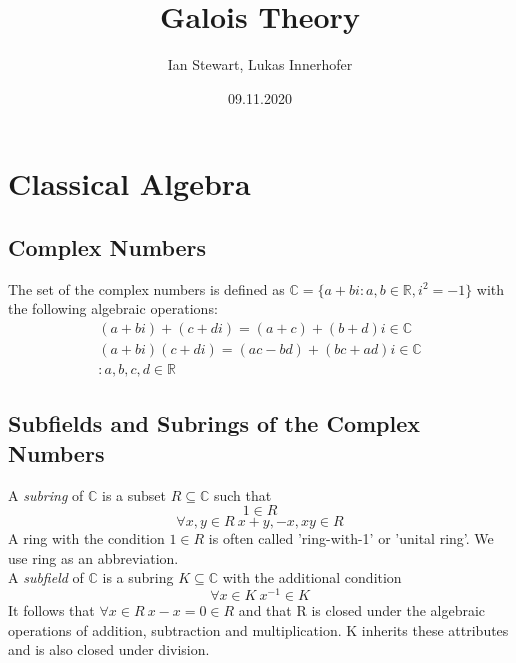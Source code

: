 \documentclass{book}
\title{Galois Theory}
\author{Ian Stewart, Lukas Innerhofer}
\date{09.11.2020}
\begin{document}
    \maketitle
    \tableofcontents

    \chapter{Classical Algebra}
    \section{Complex Numbers}
    The set of the complex numbers is defined as 
    \(\mathbb{C} = \{a + bi : a,b \in \mathbb{R},i^2 = -1\}\)
    with the following algebraic operations:
    \begin{equation} \label{complex operations}
    \begin{split}
        (a + bi) + (c + di) = (a + c) + (b + d)i \in \mathbb{C}\\
        (a + bi)(c + di) = (ac - bd) + (bc + ad)i \in \mathbb{C}\\
        :a,b,c,d \in \mathbb{R}
    \end{split}
    \end{equation}

    \section{Subfields and Subrings of the Complex Numbers}
    \begin{definition}
        A \textit{subring} of \(\mathbb{C}\) is a subset \(R \subseteq \mathbb{C}\) such that
        \[1 \in R\]
        \[\forall x,y \in R \ x + y,-x,xy \in R\]
        A ring with the condition \(1 \in R\) is often called 'ring-with-1' or 'unital ring'.
        We use ring as an abbreviation.\\
        A \textit{subfield} of \(\mathbb{C}\) is a subring \(K \subseteq \mathbb{C}\)
        with the additional condition
        \[\forall x \in K \ x^{-1} \in K\]
        It follows that \(\forall x \in R \ x - x = 0 \in R\)
        and that R is closed under the algebraic operations of addition, subtraction and multiplication.
        K inherits these attributes and is also closed under division.
    \end{definition}
\end{document}
